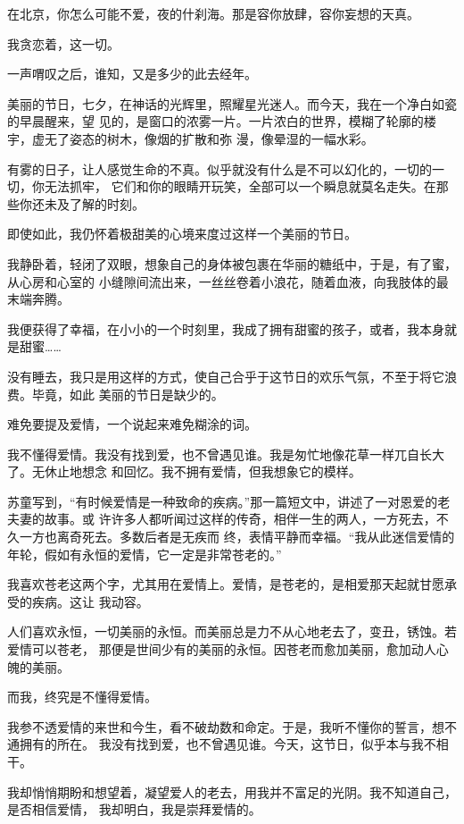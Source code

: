 \documentclass[12pt,a4paper]{article}
\begin{document}
		在北京，你怎么可能不爱，夜的什刹海。那是容你放肆，容你妄想的天真。

		我贪恋着，这一切。

	\endwriting



		一声喟叹之后，谁知，又是多少的此去经年。


		美丽的节日，七夕，在神话的光辉里，照耀星光迷人。而今天，我在一个净白如瓷的早晨醒来，望
	见的，是窗口的浓雾一片。一片浓白的世界，模糊了轮廓的楼宇，虚无了姿态的树木，像烟的扩散和弥
	漫，像晕湿的一幅水彩。

		有雾的日子，让人感觉生命的不真。似乎就没有什么是不可以幻化的，一切的一切，你无法抓牢，
	它们和你的眼睛开玩笑，全部可以一个瞬息就莫名走失。在那些你还未及了解的时刻。


		即使如此，我仍怀着极甜美的心境来度过这样一个美丽的节日。


		我静卧着，轻闭了双眼，想象自己的身体被包裹在华丽的糖纸中，于是，有了蜜，从心房和心室的
	小缝隙间流出来，一丝丝卷着小浪花，随着血液，向我肢体的最末端奔腾。

		我便获得了幸福，在小小的一个时刻里，我成了拥有甜蜜的孩子，或者，我本身就是甜蜜……


		没有睡去，我只是用这样的方式，使自己合乎于这节日的欢乐气氛，不至于将它浪费。毕竟，如此
	美丽的节日是缺少的。


		难免要提及爱情，一个说起来难免糊涂的词。


		我不懂得爱情。我没有找到爱，也不曾遇见谁。我是匆忙地像花草一样兀自长大了。无休止地想念
	和回忆。我不拥有爱情，但我想象它的模样。


		苏童写到，“有时候爱情是一种致命的疾病。”那一篇短文中，讲述了一对恩爱的老夫妻的故事。或
	许许多人都听闻过这样的传奇，相伴一生的两人，一方死去，不久一方也离奇死去。多数后者是无疾而
	终，表情平静而幸福。“我从此迷信爱情的年轮，假如有永恒的爱情，它一定是非常苍老的。”

		我喜欢苍老这两个字，尤其用在爱情上。爱情，是苍老的，是相爱那天起就甘愿承受的疾病。这让
	我动容。

		人们喜欢永恒，一切美丽的永恒。而美丽总是力不从心地老去了，变丑，锈蚀。若爱情可以苍老，
	那便是世间少有的美丽的永恒。因苍老而愈加美丽，愈加动人心魄的美丽。

		而我，终究是不懂得爱情。


		我参不透爱情的来世和今生，看不破劫数和命定。于是，我听不懂你的誓言，想不通拥有的所在。
	我没有找到爱，也不曾遇见谁。今天，这节日，似乎本与我不相干。


		我却悄悄期盼和想望着，凝望爱人的老去，用我并不富足的光阴。我不知道自己，是否相信爱情，
	我却明白，我是崇拜爱情的。
\end{document}
